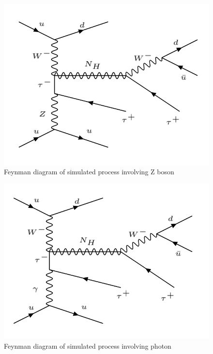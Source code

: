 \begin{figure}[H]
\centering
\includegraphics[scale = 0.45]{Figures/Feynman_hnZ}
\caption{Feynman diagram of simulated process involving Z boson}
\label{fig: hnZ}
\end{figure}

\begin{figure}[H]
\centering
\includegraphics[scale = 0.45]{Figures/Feynman_hnGamma}
\caption{Feynman diagram of simulated process involving photon}
\label{fig: hnGamma}
\end{figure}
